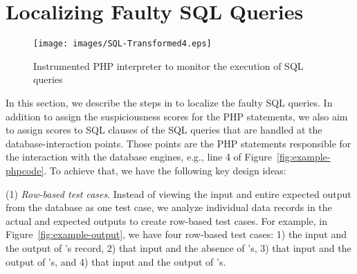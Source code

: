\section{Localizing Faulty SQL Queries}


\begin{figure}[tbp]
  \centering
  \texttt{[image: images/SQL-Transformed4.eps]} %
 \caption{Instrumented PHP interpreter to monitor the execution of SQL queries~\cite{icsm13}}\label{fig:SQL-Transformed}
\end{figure}


In this section, we describe the steps in {\tool} to localize the
faulty SQL queries. In addition to assign the suspiciousness scores
for the PHP statements, we also aim to assign scores to SQL
 clauses of the SQL queries that are handled at the
database-interaction points. Those points are the PHP statements
responsible for the interaction with the database engines, e.g., line
4 of Figure~\ref{fig:example-phpcode}.  To achieve that, we have the
following key design ideas:




(1) {\em Row-based test cases}. Instead of viewing the input and
entire expected output from the database as one test case, we analyze
individual data records in the actual and expected outputs to create
row-based test cases. For example, in Figure~\ref{fig:example-output},
we have four row-based test cases: 1) the input  and the output of 's
record, 2) that input and the absence of 's, 3) that input
and the output of 's, and 4) that input and the output of
's.

